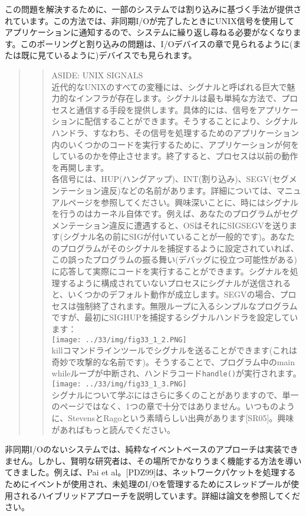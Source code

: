 この問題を解決するために、一部のシステムでは割り込みに基づく手法が提供されています。この方法では、非同期I/Oが完了したときにUNIX信号を使用してアプリケーションに通知するので、システムに繰り返し尋ねる必要がなくなります。このポーリングと割り込みの問題は、I/Oデバイスの章で見られるように(または既に見ているように)デバイスでも見られます。

\begin{quote}
\begin{quote}
ASIDE: UNIX SIGNALS\\
近代的なUNIXのすべての変種には、シグナルと呼ばれる巨大で魅力的なインフラが存在します。シグナルは最も単純な方法で、プロセスと通信する手段を提供します。具体的には、信号をアプリケーションに配信することができます。そうすることにより、シグナルハンドラ、すなわち、その信号を処理するためのアプリケーション内のいくつかのコードを実行するために、アプリケーションが何をしているのかを停止させます。終了すると、プロセスは以前の動作を再開します。\\
各信号には、HUP(ハングアップ)、INT(割り込み)、SEGV(セグメンテーション違反)などの名前があります。詳細については、マニュアルページを参照してください。興味深いことに、時にはシグナルを行うのはカーネル自体です。例えば、あなたのプログラムがセグメンテーション違反に遭遇すると、OSはそれにSIGSEGVを送ります(シグナル名の前にSIGが付いていることが一般的です)。あなたのプログラムがそのシグナルを捕捉するように設定されていれば、この誤ったプログラムの振る舞い(デバッグに役立つ可能性がある)に応答して実際にコードを実行することができます。シグナルを処理するように構成されていないプロセスにシグナルが送信されると、いくつかのデフォルト動作が成立します。SEGVの場合、プロセスは強制終了されます。無限ループに入るシンプルなプログラムですが、最初にSIGHUPを捕捉するシグナルハンドラを設定しています：\\
\texttt{[image: ../33/img/fig33\_1\_2.PNG]}\\
killコマンドラインツールでシグナルを送ることができます(これは奇妙で攻撃的な名前です)。そうすることで、プログラム中のmain
whileループが中断され、ハンドラコード\texttt{handle()}が実行されます。\\
\texttt{[image: ../33/img/fig33\_1\_3.PNG]}\\
シグナルについて学ぶにはさらに多くのことがありますので、単一のページではなく、1つの章で十分ではありません。いつものように、StevensとRagoという素晴らしい出典があります{[}SR05{]}。興味があればもっと読んでください。
\end{quote}
\end{quote}

非同期I/Oのないシステムでは、純粋なイベントベースのアプローチは実装できません。しかし、賢明な研究者は、その場所でかなりうまく機能する方法を導いてきました。例えば、Pai
et
al。{[}PDZ99{]}は、ネットワークパケットを処理するためにイベントが使用され、未処理のI/Oを管理するためにスレッドプールが使用されるハイブリッドアプローチを説明しています。詳細は論文を参照してください。

